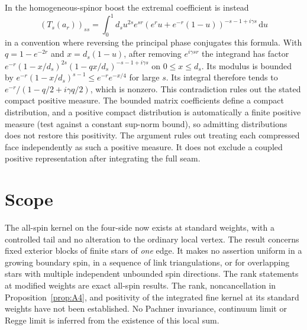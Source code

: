 \documentclass[11pt]{article}
\theoremstyle{remark}
\newcommand{\dd}{\mathrm d}
\begin{document}
In the homogeneous-spinor boost the extremal coefficient is instead
\[
 (T_s(a_r))_{ss}
 =\int_0^1d_s u^{2s}e^{sr}
 (e^r u+e^{-r}(1-u))^{-s-1+i\gamma s}\,\dd u
\]
in a convention where reversing the principal phase conjugates this formula. With \(q=1-e^{-2r}\) and \(x=d_s(1-u)\), after removing \(e^{i\gamma sr}\) the integrand has factor
\(e^{-r}(1-x/d_s)^{2s}(1-qx/d_s)^{-s-1+i\gamma s}\) on \(0\le x\le d_s\). Its modulus is bounded by \(e^{-r}(1-x/d_s)^{s-1}\le e^{-r}e^{-x/4}\) for large \(s\). Its integral therefore tends to \(e^{-r}/(1-q/2+i\gamma q/2)\), which is nonzero. This contradiction rules out the stated compact positive measure. The bounded matrix coefficients define a compact distribution, and a positive compact distribution is automatically a finite positive measure (test against a constant sup-norm bound), so admitting distributions does not restore this positivity. The argument rules out treating each compressed face independently as such a positive measure. It does not exclude a coupled positive representation after integrating the full seam.

\section{Scope}
The all-spin kernel on the four-side now exists at standard weights, with a controlled tail and no alteration to the ordinary local vertex. The result concerns fixed exterior blocks of finite stars of \emph{one} edge. It makes no assertion uniform in a growing boundary spin, in a sequence of link triangulations, or for overlapping stars with multiple independent unbounded spin directions. The rank statements at modified weights are exact all-spin results. The rank, noncancellation in Proposition~\ref{prop:A4}, and positivity of the integrated fine kernel at its standard weights have not been established. No Pachner invariance, continuum limit or Regge limit is inferred from the existence of this local sum.
\end{document}
